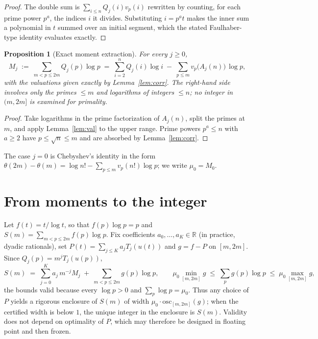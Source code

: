 \documentclass[11pt]{article}
\newtheorem{proposition}{Proposition}
\theoremstyle{remark}
\begin{document}
\begin{proof}
The double sum is $\sum_{i \le n} Q_j(i) v_p(i)$ rewritten by counting, for each prime power $p^a$, the
indices $i$ it divides. Substituting $i = p^a t$ makes the inner sum a polynomial in $t$ summed over an
initial segment, which the stated Faulhaber-type identity evaluates exactly.
\end{proof}

\begin{proposition}[Exact moment extraction]\label{prop:extract}
For every $j \ge 0$,
\[
M_j \;:=\; \sum_{m < p \le 2m} Q_j(p) \log p
\;=\; \sum_{i=2}^{n} Q_j(i) \log i \;-\; \sum_{p \le m} v_p\big(A_j(n)\big)\, \log p ,
\]
with the valuations given exactly by Lemma~\ref{lem:corr}. The right-hand side involves only the primes
$\le m$ and logarithms of integers $\le n$; no integer in $(m, 2m]$ is examined for primality.
\end{proposition}

\begin{proof}
Take logarithms in the prime factorization of $A_j(n)$, split the primes at $m$, and apply
Lemma~\ref{lem:val} to the upper range. Prime powers $p^a \le n$ with $a \ge 2$ have $p \le \sqrt{n} \le m$
and are absorbed by Lemma~\ref{lem:corr}.
\end{proof}

The case $j = 0$ is Chebyshev's identity in the form
$\theta(2m) - \theta(m) = \log n! - \sum_{p \le m} v_p(n!) \log p$; we write $\mu_0 = M_0$.

\section{From moments to the integer}

Let $f(t) = t/\log t$, so that $f(p)\log p = p$ and
$S(m) = \sum_{m < p \le 2m} f(p) \log p$. Fix coefficients $a_0, \dots, a_K \in \mathbb{R}$
(in practice, dyadic rationals), set $P(t) = \sum_{j \le K} a_j T_j(u(t))$ and $g = f - P$ on
$[m, 2m]$. Since $Q_j(p) = m^j T_j(u(p))$,
\begin{equation}\label{eq:sandwich}
S(m) \;=\; \sum_{j=0}^{K} a_j\, m^{-j} M_j \;+\; \sum_{m < p \le 2m} g(p) \log p ,
\qquad
\mu_0 \min_{[m,2m]} g \;\le\; \sum_p g(p)\log p \;\le\; \mu_0 \max_{[m,2m]} g ,
\end{equation}
the bounds valid because every $\log p > 0$ and $\sum_p \log p = \mu_0$. Thus any choice of $P$ yields a
rigorous enclosure of $S(m)$ of width $\mu_0 \cdot \mathrm{osc}_{[m,2m]}(g)$; when the certified width is
below $1$, the unique integer in the enclosure is $S(m)$. Validity does not depend on optimality of $P$,
which may therefore be designed in floating point and then frozen.
\end{document}
